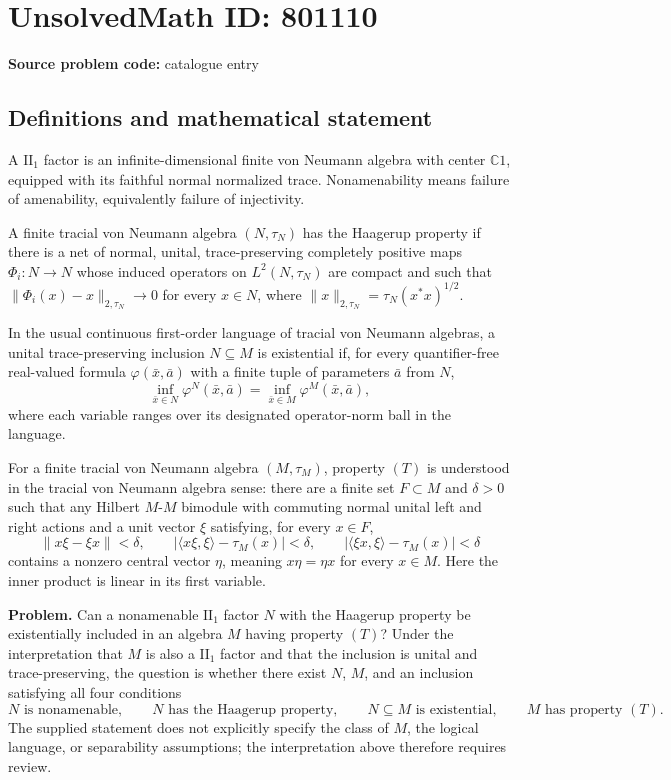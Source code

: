 \documentclass[11pt]{article}
\newcommand{\C}{\mathbb{C}}
\begin{document}
\section*{UnsolvedMath ID: 801110}
\textbf{Source problem code:} catalogue entry
\subsection{Definitions and mathematical statement}
A \(\mathrm{II}_1\) factor is an infinite-dimensional finite von Neumann algebra with center \(\C 1\), equipped with its faithful normal normalized trace. Nonamenability means failure of amenability, equivalently failure of injectivity.

A finite tracial von Neumann algebra \((N,\tau_N)\) has the Haagerup property if there is a net of normal, unital, trace-preserving completely positive maps \(\Phi_i:N\to N\) whose induced operators on \(L^2(N,\tau_N)\) are compact and such that \(\|\Phi_i(x)-x\|_{2,\tau_N}\to0\) for every \(x\in N\), where \(\|x\|_{2,\tau_N}=\tau_N(x^*x)^{1/2}\).

In the usual continuous first-order language of tracial von Neumann algebras, a unital trace-preserving inclusion \(N\subseteq M\) is existential if, for every quantifier-free real-valued formula \(\varphi(\bar x,\bar a)\) with a finite tuple of parameters \(\bar a\) from \(N\),
\[
\inf_{\bar x\in N}\varphi^N(\bar x,\bar a)
=
\inf_{\bar x\in M}\varphi^M(\bar x,\bar a),
\]
where each variable ranges over its designated operator-norm ball in the language.

For a finite tracial von Neumann algebra \((M,\tau_M)\), property \((T)\) is understood in the tracial von Neumann algebra sense: there are a finite set \(F\subset M\) and \(\delta>0\) such that any Hilbert \(M\)-\(M\) bimodule with commuting normal unital left and right actions and a unit vector \(\xi\) satisfying, for every \(x\in F\),
\[
\|x\xi-\xi x\|<\delta,\qquad
\bigl|\langle x\xi,\xi\rangle-\tau_M(x)\bigr|<\delta,\qquad
\bigl|\langle \xi x,\xi\rangle-\tau_M(x)\bigr|<\delta
\]
contains a nonzero central vector \(\eta\), meaning \(x\eta=\eta x\) for every \(x\in M\). Here the inner product is linear in its first variable.

\textbf{Problem.} Can a nonamenable \(\mathrm{II}_1\) factor \(N\) with the Haagerup property be existentially included in an algebra \(M\) having property \((T)\)? Under the interpretation that \(M\) is also a \(\mathrm{II}_1\) factor and that the inclusion is unital and trace-preserving, the question is whether there exist \(N\), \(M\), and an inclusion satisfying all four conditions
\[
N\text{ is nonamenable},\qquad
N\text{ has the Haagerup property},\qquad
N\subseteq M\text{ is existential},\qquad
M\text{ has property }(T).
\]
The supplied statement does not explicitly specify the class of \(M\), the logical language, or separability assumptions; the interpretation above therefore requires review.
\end{document}
